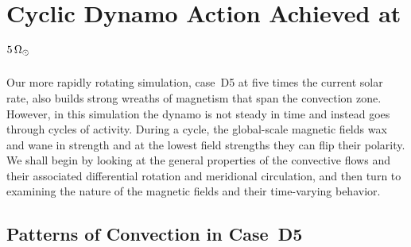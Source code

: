 %     
%
%

\chapter{Cyclic Dynamo Action Achieved at $5\thinspace\Omega_\odot$}
\label{chapter:case D5}
\label{sec:oscillating_dynamo}
Our more rapidly rotating simulation, case~D5 at five times
the current solar rate, also builds strong wreaths of magnetism that
span the convection zone.  However, in this simulation the dynamo is not steady
in time and instead goes through cycles of activity.  During a cycle,
the global-scale magnetic fields wax and wane in strength and at the
lowest field strengths they can flip their polarity.
We shall begin by looking at the general properties of the convective
flows and their associated differential rotation and meridional
circulation, and then turn to examining the nature of the magnetic
fields and their time-varying behavior.


\section{Patterns of Convection in Case~D5}

